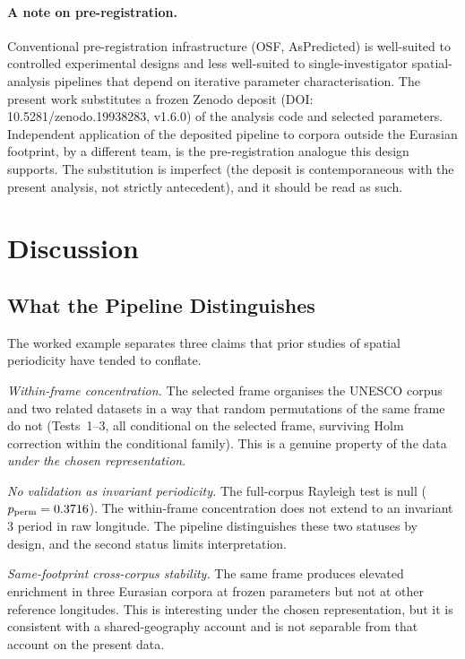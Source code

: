 \documentclass[12pt,a4paper]{article}
\newcommand{\degr}{\ifmmode{^\circ}\else\textdegree{}\fi}
\begin{document}
\paragraph{A note on pre-registration.} Conventional pre-registration
infrastructure (OSF, AsPredicted) is well-suited to controlled
experimental designs and less well-suited to single-investigator
spatial-analysis pipelines that depend on iterative parameter
characterisation. The present work substitutes a frozen Zenodo
deposit (DOI: 10.5281/zenodo.19938283, v1.6.0) of the analysis code
and selected parameters. Independent application of the deposited
pipeline to corpora outside the Eurasian footprint, by a different
team, is the pre-registration analogue this design supports. The
substitution is imperfect (the deposit is contemporaneous with the
present analysis, not strictly antecedent), and it should be read as
such.

\section{Discussion}
\label{sec:discussion}

\subsection{What the Pipeline Distinguishes}

The worked example separates three claims that prior studies of
spatial periodicity have tended to conflate.

\emph{Within-frame concentration.} The selected frame organises the
UNESCO corpus and two related datasets in a way that random
permutations of the same frame do not (Tests~1--3, all conditional on
the selected frame, surviving Holm correction within the conditional
family). This is a genuine property of the data \emph{under the
chosen representation}.

\emph{No validation as invariant periodicity.} The full-corpus Rayleigh
test is null
($p_{\mathrm{perm}} = 0.3716$). The within-frame
concentration does not extend to an invariant 3\degr{} period in raw
longitude. The pipeline distinguishes these two statuses by design,
and the second status limits interpretation.

\emph{Same-footprint cross-corpus stability.} The same frame produces
elevated enrichment in three Eurasian corpora at frozen parameters but
not at other reference longitudes. This is interesting under the chosen
representation, but it is consistent with a shared-geography account
and is not separable from that account on the present data.
\end{document}
